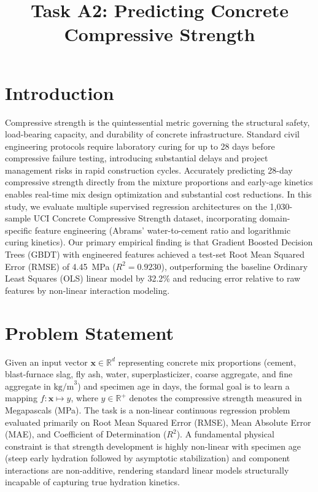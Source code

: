 \documentclass[10pt,conference,a4paper]{IEEEtran}
\title{Task A2: Predicting Concrete Compressive Strength}
\author{
    \IEEEauthorblockN{Syed Faran Ali \quad|\quad Roll No. 866770 \quad|\quad SAP ID: 70177784 \quad|\quad Section A}
    \IEEEauthorblockA{Department of Intelligent Systems, The University of Lahore}
    \IEEEauthorblockA{Repository: \url{https://github.com/Faran70177784/AI101-ML-Assignment} \quad|\quad Instructor: Dr. Muhammad Awais, AI Architect}
}
\begin{document}
\maketitle

\section{Introduction}
Compressive strength is the quintessential metric governing the structural safety, load-bearing capacity, and durability of concrete infrastructure. Standard civil engineering protocols require laboratory curing for up to 28 days before compressive failure testing, introducing substantial delays and project management risks in rapid construction cycles. Accurately predicting 28-day compressive strength directly from the mixture proportions and early-age kinetics enables real-time mix design optimization and substantial cost reductions. In this study, we evaluate multiple supervised regression architectures on the 1,030-sample UCI Concrete Compressive Strength dataset, incorporating domain-specific feature engineering (Abrams' water-to-cement ratio and logarithmic curing kinetics). Our primary empirical finding is that Gradient Boosted Decision Trees (GBDT) with engineered features achieved a test-set Root Mean Squared Error (RMSE) of 4.45~MPa ($R^2 = 0.9230$), outperforming the baseline Ordinary Least Squares (OLS) linear model by 32.2\% and reducing error relative to raw features by non-linear interaction modeling.

\section{Problem Statement}
Given an input vector $\mathbf{x} \in \mathbb{R}^d$ representing concrete mix proportions (cement, blast-furnace slag, fly ash, water, superplasticizer, coarse aggregate, and fine aggregate in $\text{kg/m}^3$) and specimen age in days, the formal goal is to learn a mapping $f: \mathbf{x} \mapsto y$, where $y \in \mathbb{R}^+$ denotes the compressive strength measured in Megapascals (MPa). The task is a non-linear continuous regression problem evaluated primarily on Root Mean Squared Error (RMSE), Mean Absolute Error (MAE), and Coefficient of Determination ($R^2$). A fundamental physical constraint is that strength development is highly non-linear with specimen age (steep early hydration followed by asymptotic stabilization) and component interactions are non-additive, rendering standard linear models structurally incapable of capturing true hydration kinetics.
\end{document}
